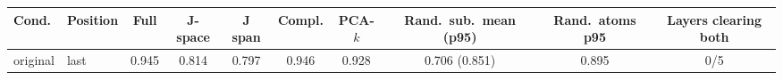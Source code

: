 \begin{tabular}{llcccccccc}\toprule
Cond. & Position & Full & J-space & J span & Compl. & PCA-$k$ & Rand.\ sub.\ mean (p95) & Rand.\ atoms p95 & Layers clearing both\\\midrule
original & last & 0.945 & 0.814 & 0.797 & 0.946 & 0.928 & 0.706 (0.851) & 0.895 & 0/5\\
\midrule
\bottomrule\end{tabular}
